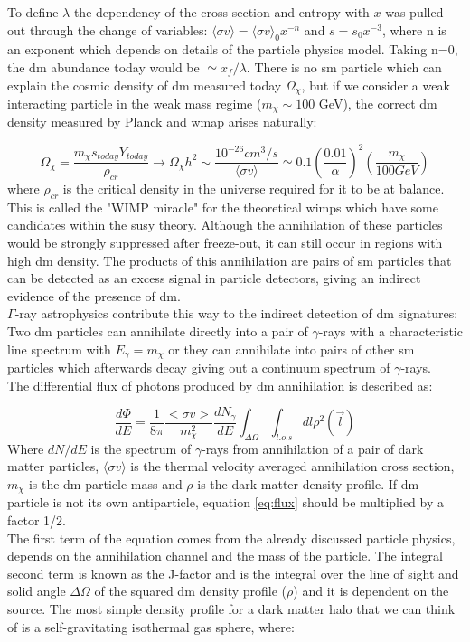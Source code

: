 \documentclass[main.tex]{subfiles}
\begin{document}
To define $\lambda$ the dependency of the cross section and entropy with $x$ was pulled out through the change of variables: $\langle\sigma v \rangle = \langle\sigma v \rangle_{0} x^{-n}$ and $s=s_{0}x^{-3}$, where n is an exponent which depends on details of the particle physics model. Taking n=0, the \gls{dm} abundance today would be $\simeq x_{f}/\lambda$.
There is no \gls{sm} particle which can explain the cosmic density of \gls{dm} measured today $\Omega_{\chi}$, but if we consider a weak interacting particle in the weak mass regime ($m_{\chi}\sim 100$ GeV), the correct \gls{dm} density measured by Planck and \gls{wmap} arises naturally:

\begin{equation}
    \Omega_{\chi}=\frac{m_{\chi}s_{today}Y_{today}}{\rho_{cr}}\rightarrow \Omega_{\chi} h^{2}\sim \frac{10^{-26}cm^{3}/s}{\langle\sigma v\rangle} \simeq 0.1 \left(\frac{0.01}{\alpha}\right)^{2}\left( \frac{m_{\chi}}{100 GeV}\right) 
\end{equation}
where $\rho_{cr}$ is the critical density in the universe required for it to be at balance.
This is called the "WIMP miracle" for the theoretical \glspl{wimp} which have some candidates within the \gls{susy} theory. Although the annihilation of these particles would be strongly suppressed after freeze-out, it can still occur in regions with high \gls{dm} density. The products of this annihilation are pairs of \gls{sm} particles that can be detected as an excess signal in particle detectors, giving an indirect evidence of the presence of \gls{dm}.\\
 $\Gamma$-ray astrophysics contribute this way to the indirect detection of \gls{dm} signatures: Two \gls{dm} particles can annihilate directly into a pair of $\gamma$-rays with a characteristic line spectrum with $E_{\gamma}=m_\chi$ or they can annihilate into pairs of other \gls{sm} particles which afterwards decay giving out a continuum spectrum of $\gamma$-rays.\\
The differential flux of photons produced by \gls{dm} annihilation is described as:

\begin{equation}
    \frac{d \Phi}{dE}=\frac{1}{8 \pi} \frac{<\sigma v>}{m_{\chi}^2} \frac{d N_{\gamma}}{dE} \int_{\Delta\Omega}\int_{l.o.s} dl \rho^2(\vec{l})
\label{eq:flux}
\end{equation}
Where $dN/dE$ is the spectrum of $\gamma$-rays from annihilation of a pair of dark matter particles, $\langle\sigma v\rangle$ is the thermal velocity averaged annihilation cross section, $m_\chi$ is the \gls{dm} particle mass and $\rho$ is the dark matter density profile. If \gls{dm} particle is not its own antiparticle, equation \ref{eq:flux} should be multiplied by a factor 1/2. \\
The first term of the equation comes from the already discussed particle physics, depends on the annihilation channel and the mass of the particle. The integral second term is known as the J-factor and is the integral over the line of sight and solid angle $\Delta\Omega$ of the squared \gls{dm} density profile ($\rho$) and it is dependent on the source. The most simple density profile for a dark matter halo that we can think of is a self-gravitating isothermal gas sphere, where:
\end{document}
